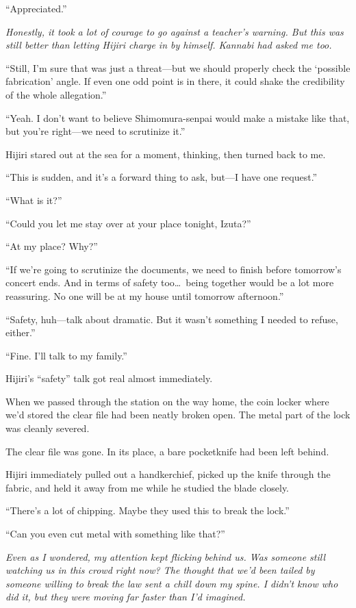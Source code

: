 \documentclass[
    a4paper,
    12pt,
    twoside,
    openany,
    UTF8,
    fontset=windows
]{ctexbook}
\begin{document}
``Appreciated.''

\textit{Honestly, it took a lot of courage to go against a teacher's warning. But this was still better than letting Hijiri charge in by himself. Kannabi had asked me too.}

``Still, I'm sure that was just a threat---but we should properly check the `possible fabrication' angle. If even one odd point is in there, it could shake the credibility of the whole allegation.''

``Yeah. I don't want to believe Shimomura-senpai would make a mistake like that, but you're right---we need to scrutinize it.''

Hijiri stared out at the sea for a moment, thinking, then turned back to me.

``This is sudden, and it's a forward thing to ask, but---I have one request.''

``What is it?''

``Could you let me stay over at your place tonight, Izuta?''

``At my place? Why?''

``If we're going to scrutinize the documents, we need to finish before tomorrow's concert ends. And in terms of safety too\dots\ being together would be a lot more reassuring. No one will be at my house until tomorrow afternoon.''

``Safety, huh---talk about dramatic. But it wasn't something I needed to refuse, either.''

``Fine. I'll talk to my family.''

Hijiri's ``safety'' talk got real almost immediately.

When we passed through the station on the way home, the coin locker where we'd stored the clear file had been neatly broken open. The metal part of the lock was cleanly severed.

The clear file was gone. In its place, a bare pocketknife had been left behind.

Hijiri immediately pulled out a handkerchief, picked up the knife through the fabric, and held it away from me while he studied the blade closely.

``There's a lot of chipping. Maybe they used this to break the lock.''

``Can you even cut metal with something like that?''

\textit{Even as I wondered, my attention kept flicking behind us. Was someone still watching us in this crowd right now? The thought that we'd been tailed by someone willing to break the law sent a chill down my spine. I didn't know who did it, but they were moving far faster than I'd imagined.}
\end{document}
